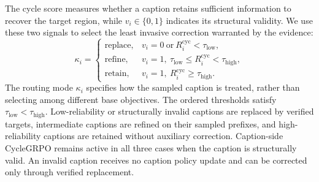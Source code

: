\documentclass{article}
\begin{document}
The cycle score measures whether a caption retains sufficient information to recover the target region, while $v_i\in\{0,1\}$ indicates its structural validity. We use these two signals to select the least invasive correction warranted by the evidence:
\begin{equation}\label{eq:route}
 \kappa_i=
 \begin{cases}
 \mathrm{replace}, & v_i=0\ \text{or}\ R_i^{\mathrm{cyc}}<\tau_{\mathrm{low}},\\
 \mathrm{refine}, & v_i=1,\ \tau_{\mathrm{low}}\le R_i^{\mathrm{cyc}}<\tau_{\mathrm{high}},\\
 \mathrm{retain}, & v_i=1,\ R_i^{\mathrm{cyc}}\ge\tau_{\mathrm{high}}.
 \end{cases}
\end{equation}
The routing mode $\kappa_i$ specifies how the sampled caption is treated, rather than selecting among different base objectives. The ordered thresholds satisfy $\tau_{\mathrm{low}}<\tau_{\mathrm{high}}$. Low-reliability or structurally invalid captions are replaced by verified targets, intermediate captions are refined on their sampled prefixes, and high-reliability captions are retained without auxiliary correction. Caption-side CycleGRPO remains active in all three cases when the caption is structurally valid. An invalid caption receives no caption policy update and can be corrected only through verified replacement.
\end{document}
